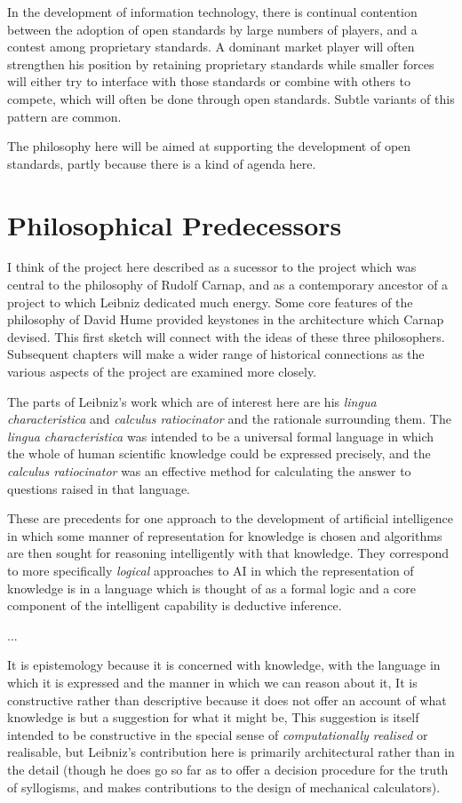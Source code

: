 In the development of information technology, there is continual contention between
the adoption of open standards by large numbers of players, and a contest among
proprietary standards.
A dominant market player will often strengthen his position by retaining proprietary
standards while smaller forces will either try to interface with those standards
or combine with others to compete, which will often be done through open standards.
Subtle variants of this pattern are common.

The philosophy here will be aimed at supporting the development of open standards,
partly because there is a kind of agenda here.

\section{Philosophical Predecessors}

I think of the project here described as a sucessor to the project which
was central to the philosophy of Rudolf Carnap, and as a contemporary ancestor
of a project to which Leibniz dedicated much energy.
Some core features of the philosophy of David Hume provided keystones in
the architecture which Carnap devised.
This first sketch will connect with the ideas of these three philosophers.
Subsequent chapters will make a wider range of historical connections
as the various aspects of the project are examined more closely.

The parts of Leibniz's work which are of interest here are his
\emph{lingua characteristica} and \emph{calculus ratiocinator} and the
rationale surrounding them.
The \emph{lingua characteristica} was intended to be a universal formal language
in which the whole of human scientific knowledge could be expressed precisely,
and the \emph{calculus ratiocinator} was an effective method for calculating
the answer to questions raised in that language.

These are precedents for one approach to the development of artificial intelligence
in which some manner of representation for knowledge is chosen and algorithms
are then sought for reasoning intelligently with that knowledge. 
They correspond to more specifically \emph{logical} approaches to AI
in which the representation of knowledge is in a language which is thought
of as a formal logic and a core component of the intelligent capability is
deductive inference.

...

It is epistemology because it is concerned with knowledge, with the language
in which it is expressed and the manner in which we can reason about it,
It is constructive rather than descriptive because it does not offer an account
of what knowledge is but a suggestion for what it might be,
This suggestion is itself intended to be constructive in the special sense
of \emph{computationally realised} or realisable, but Leibniz's contribution here is
primarily architectural rather than in the detail (though he does go so far as to
offer a decision procedure for the truth of syllogisms, and makes contributions
to the design of mechanical calculators).

